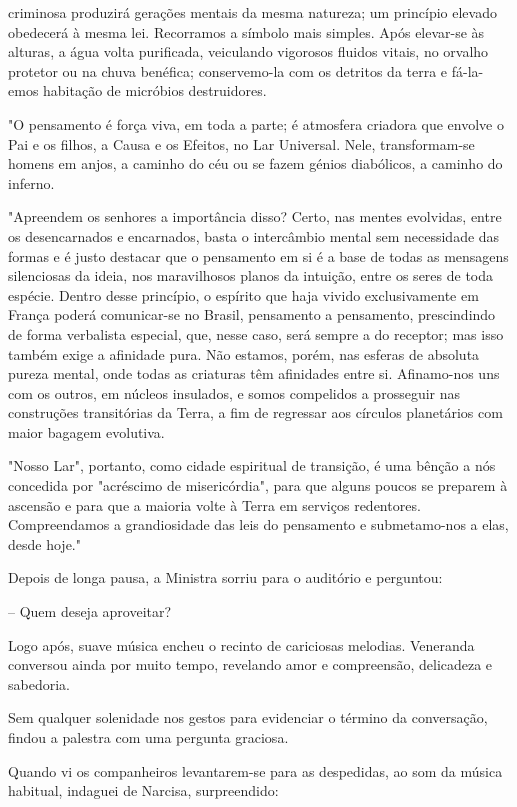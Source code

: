 \documentclass[portuguese,12pt,a4paper]{scrbook}
\begin{document}
	
	criminosa produzirá gerações mentais da mesma natureza; um princípio elevado obedecerá à mesma lei. Recorramos a símbolo mais simples. Após elevar-se às alturas, a água volta purificada, veiculando vigorosos fluidos vitais, no orvalho protetor ou na chuva benéfica; conservemo-la com os detritos da terra e fá-la-emos habitação de micróbios destruidores.
	
	"O pensamento é força viva, em toda a parte; é atmosfera criadora que envolve o Pai e os filhos, a Causa e os Efeitos, no Lar Universal. Nele, transformam-se homens em anjos, a caminho do céu ou se fazem génios diabólicos, a caminho do inferno.
	
	"Apreendem os senhores a importância disso? Certo, nas mentes evolvidas, entre os desencarnados e encarnados, basta o intercâmbio mental sem necessidade das formas e é justo destacar que o pensamento em si é a base de todas as mensagens silenciosas da ideia, nos maravilhosos planos da intuição, entre os seres de toda espécie. Dentro desse princípio, o espírito que haja vivido exclusivamente em França poderá comunicar-se no Brasil, pensamento a pensamento, prescindindo de forma verbalista especial, que, nesse caso, será sempre a do receptor; mas isso também exige a afinidade pura. Não estamos, porém, nas esferas de absoluta pureza mental, onde todas as criaturas têm afinidades entre si. Afinamo-nos uns com os outros, em núcleos insulados, e somos compelidos a prosseguir nas construções transitórias da Terra, a fim de regressar aos círculos planetários com maior bagagem evolutiva.
	
	"Nosso Lar", portanto, como cidade espiritual de transição, é uma bênção a nós concedida por "acréscimo de misericórdia", para que alguns poucos se preparem à ascensão e para que a maioria volte à Terra em serviços redentores. Compreendamos a grandiosidade das leis do pensamento e submetamo-nos a elas, desde hoje."
	
	
	Depois de longa pausa, a Ministra sorriu para o auditório e perguntou:
	
	– Quem deseja aproveitar?
	
	Logo após, suave música encheu o recinto de cariciosas melodias. Veneranda conversou ainda por muito tempo, revelando amor e compreensão, delicadeza e sabedoria.
	
	Sem qualquer solenidade nos gestos para evidenciar o término da conversação, findou a palestra com uma pergunta graciosa.
	
	Quando vi os companheiros levantarem-se para as despedidas, ao som da música habitual, indaguei de Narcisa, surpreendido:
	
\end{document}
